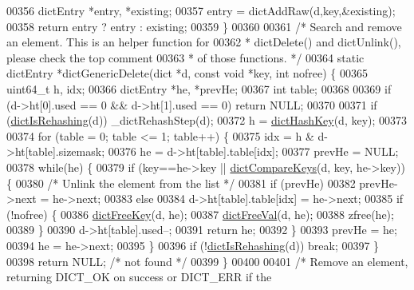 \begin{DoxyCode}
00356     dictEntry *entry, *existing;
00357     entry = dictAddRaw(d,key,&existing);
00358     \textcolor{keywordflow}{return} entry ? entry : existing;
00359 \}
00360 
00361 \textcolor{comment}{/* Search and remove an element. This is an helper function for}
00362 \textcolor{comment}{ * dictDelete() and dictUnlink(), please check the top comment}
00363 \textcolor{comment}{ * of those functions. */}
00364 \textcolor{keyword}{static} dictEntry *dictGenericDelete(dict *d, \textcolor{keyword}{const} \textcolor{keywordtype}{void} *key, \textcolor{keywordtype}{int} nofree) \{
00365     uint64\_t h, idx;
00366     dictEntry *he, *prevHe;
00367     \textcolor{keywordtype}{int} table;
00368 
00369     \textcolor{keywordflow}{if} (d->ht[0].used == 0 && d->ht[1].used == 0) \textcolor{keywordflow}{return} NULL;
00370 
00371     \textcolor{keywordflow}{if} (\hyperlink{dict_8h_aa6e4917a6a32fdf47180e03ed8969e02}{dictIsRehashing}(d)) \_dictRehashStep(d);
00372     h = \hyperlink{dict_8h_a15a270e95a4eea30557df137e9747a95}{dictHashKey}(d, key);
00373 
00374     \textcolor{keywordflow}{for} (table = 0; table <= 1; table++) \{
00375         idx = h & d->ht[table].sizemask;
00376         he = d->ht[table].table[idx];
00377         prevHe = NULL;
00378         \textcolor{keywordflow}{while}(he) \{
00379             \textcolor{keywordflow}{if} (key==he->key || \hyperlink{dict_8h_ab373389c580b8441ab28082cb7643762}{dictCompareKeys}(d, key, he->key)) \{
00380                 \textcolor{comment}{/* Unlink the element from the list */}
00381                 \textcolor{keywordflow}{if} (prevHe)
00382                     prevHe->next = he->next;
00383                 \textcolor{keywordflow}{else}
00384                     d->ht[table].table[idx] = he->next;
00385                 \textcolor{keywordflow}{if} (!nofree) \{
00386                     \hyperlink{dict_8h_a29fe9bb2bf0eac2c86a613536afe73ca}{dictFreeKey}(d, he);
00387                     \hyperlink{dict_8h_a4a90ee4c2d8391f2d6f9c65ccf4ba037}{dictFreeVal}(d, he);
00388                     zfree(he);
00389                 \}
00390                 d->ht[table].used--;
00391                 \textcolor{keywordflow}{return} he;
00392             \}
00393             prevHe = he;
00394             he = he->next;
00395         \}
00396         \textcolor{keywordflow}{if} (!\hyperlink{dict_8h_aa6e4917a6a32fdf47180e03ed8969e02}{dictIsRehashing}(d)) \textcolor{keywordflow}{break};
00397     \}
00398     \textcolor{keywordflow}{return} NULL; \textcolor{comment}{/* not found */}
00399 \}
00400 
00401 \textcolor{comment}{/* Remove an element, returning DICT\_OK on success or DICT\_ERR if the}

\end{DoxyCode}
